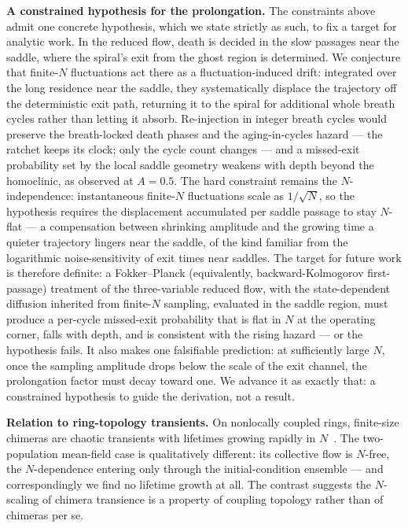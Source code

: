 \documentclass[aip,preprint,amsmath,amssymb]{revtex4-2}
\begin{document}
\textbf{A constrained hypothesis for the prolongation.} The constraints above
admit one concrete hypothesis, which we state strictly as such, to fix a target
for analytic work. In the reduced flow, death is decided in the slow passages
near the saddle, where the spiral's exit from the ghost region is determined. We
conjecture that finite-$N$ fluctuations act there as a fluctuation-induced
drift: integrated over the long residence near the saddle, they systematically
displace the trajectory off the deterministic exit path, returning it to the
spiral for additional whole breath cycles rather than letting it absorb.
Re-injection in integer breath cycles would preserve the breath-locked death
phases and the aging-in-cycles hazard --- the ratchet keeps its clock; only the
cycle count changes --- and a missed-exit probability set by the local saddle
geometry weakens with depth beyond the homoclinic, as observed at $A = 0.5$. The
hard constraint remains the $N$-independence: instantaneous finite-$N$
fluctuations scale as $1/\sqrt N$, so the hypothesis requires the displacement
accumulated per saddle passage to stay $N$-flat --- a compensation between
shrinking amplitude and the growing time a quieter trajectory lingers near the
saddle, of the kind familiar from the logarithmic noise-sensitivity of exit
times near saddles. The target for future work is therefore definite: a
Fokker--Planck (equivalently, backward-Kolmogorov first-passage) treatment of
the three-variable reduced flow, with the state-dependent diffusion inherited
from finite-$N$ sampling, evaluated in the saddle region, must produce a
per-cycle missed-exit probability that is flat in $N$ at the operating corner,
falls with depth, and is consistent with the rising hazard --- or the hypothesis
fails. It also makes one falsifiable prediction: at sufficiently large $N$,
once the sampling amplitude drops below the scale of the exit channel, the
prolongation factor must decay toward one. We advance it as exactly that: a
constrained hypothesis to guide the derivation, not a result.

\textbf{Relation to ring-topology transients.} On nonlocally coupled rings,
finite-size chimeras are chaotic transients with lifetimes growing rapidly in
$N$~\cite{wo2011}. The two-population mean-field case is qualitatively different:
its collective flow is $N$-free, the $N$-dependence entering only through the
initial-condition ensemble --- and correspondingly we find no lifetime growth at
all. The contrast suggests the $N$-scaling of chimera transience is a property of
coupling topology rather than of chimeras per se.
\end{document}
